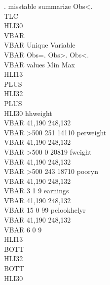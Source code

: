 . misstable summarize
                                                               Obs<.
                                                {\lbr}\\TLC{\rbr}\\HLI{\lbr}30{\rbr}
               {\lbr}\\VBAR{\rbr}                                {\lbr}\\VBAR{\rbr} Unique
      Variable {\lbr}\\VBAR{\rbr}     Obs=.     Obs>.     Obs<.  {\lbr}\\VBAR{\rbr} values        Min         Max
  \\HLI{\lbr}13{\rbr}{\lbr}\\PLUS{\rbr}\\HLI{\lbr}32{\rbr}{\lbr}\\PLUS{\rbr}\\HLI{\lbr}30{\rbr}
      hhweight {\lbr}\\VBAR{\rbr}    41,190             248,132  {\lbr}\\VBAR{\rbr}   >500        251       14110
     perweight {\lbr}\\VBAR{\rbr}    41,190             248,132  {\lbr}\\VBAR{\rbr}   >500          0       20819
       fweight {\lbr}\\VBAR{\rbr}    41,190             248,132  {\lbr}\\VBAR{\rbr}   >500        243       18710
        pooryn {\lbr}\\VBAR{\rbr}    41,190             248,132  {\lbr}\\VBAR{\rbr}      3          1           9
      earnings {\lbr}\\VBAR{\rbr}    41,190             248,132  {\lbr}\\VBAR{\rbr}     15          0          99
   pclookhelyr {\lbr}\\VBAR{\rbr}    41,190             248,132  {\lbr}\\VBAR{\rbr}      6          0           9
  \\HLI{\lbr}13{\rbr}{\lbr}\\BOTT{\rbr}\\HLI{\lbr}32{\rbr}{\lbr}\\BOTT{\rbr}\\HLI{\lbr}30{\rbr}
